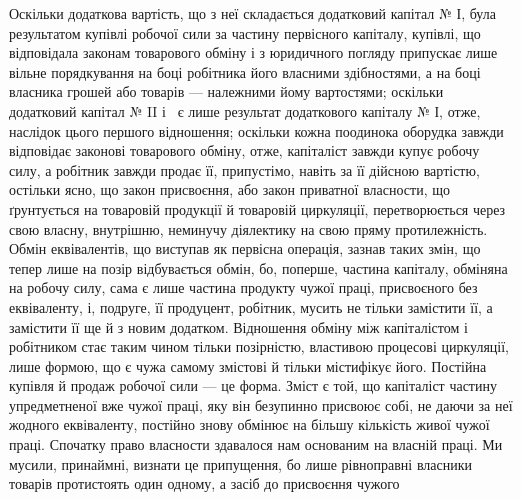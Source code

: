 Оскільки додаткова вартість, що з неї складається додатковий
капітал № І, була результатом купівлі робочої сили за частину
первісного капіталу, купівлі, що відповідала законам товарового
обміну і з юридичного погляду припускає лише вільне порядкування
на боці робітника його власними здібностями, а на боці
власника грошей або товарів — належними йому вартостями;
оскільки додатковий капітал № II і~ є лише результат додаткового
капіталу № І, отже, наслідок цього першого відношення;
оскільки кожна поодинока оборудка завжди відповідає
законові товарового обміну, отже, капіталіст завжди купує
робочу силу, а робітник завжди продає її, припустімо, навіть
за її дійсною вартістю, остільки ясно, що закон присвоєння, або
закон приватної власности, що ґрунтується на товаровій продукції
й товаровій циркуляції, перетворюється через свою власну,
внутрішню, неминучу діялектику на свою пряму протилежність.
Обмін еквівалентів, що виступав як первісна операція, зазнав
таких змін, що тепер лише на позір відбувається обмін, бо, поперше,
частина капіталу, обміняна на робочу силу, сама є лише
частина продукту чужої праці, присвоєного без еквіваленту, і,
подруге, її продуцент, робітник, мусить не тільки замістити її,
а замістити її ще й з новим додатком. Відношення обміну між
капіталістом і робітником стає таким чином тільки позірністю,
властивою процесові циркуляції, лише формою, що є чужа самому
змістові й тільки містифікує його. Постійна купівля й продаж
робочої сили — це форма. Зміст є той, що капіталіст частину
упредметненої вже чужої праці, яку він безупинно присвоює
собі, не даючи за неї жодного еквіваленту, постійно знову обмінює
на більшу кількість живої чужої праці. Спочатку право
власности здавалося нам основаним на власній праці. Ми мусили,
принаймні, визнати це припущення, бо лише рівноправні власники
товарів протистоять один одному, а засіб до присвоєння чужого
\parbreak{}  %

